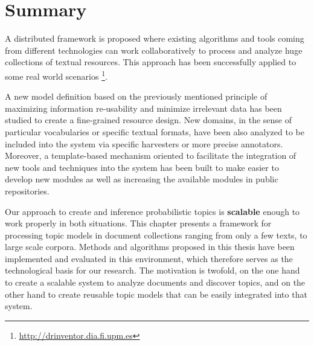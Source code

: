 \section{Summary}

A distributed framework is proposed where existing algorithms and tools coming from different technologies can work collaboratively to process and analyze huge collections of textual resources. This approach has been successfully applied to some real world scenarios \footnote{\url{http://drinventor.dia.fi.upm.es}}.
 
A new model definition based on the previously mentioned principle of maximizing information re-usability and minimize irrelevant data has been studied to create a fine-grained resource design. New domains, in the sense of particular vocabularies or specific textual formats, have been also analyzed to be included into the system via specific harvesters or more precise annotators. Moreover, a template-based mechanism oriented to facilitate the integration of new tools and techniques into the system has been built to make easier to develop new modules as well as increasing the available modules in public repositories.

Our approach to create and inference probabilistic topics is \textbf{scalable} enough to work properly in both situations. This chapter presents a framework for processing topic models in document collections ranging from only a few texts, to large scale corpora. Methods and algorithms proposed in this thesis have been implemented and evaluated in this environment, which therefore serves as the technological basis for our research. The motivation is twofold, on the one hand to create a scalable system to analyze documents and discover topics, and on the other hand to create reusable topic models that can be easily integrated into that system.
